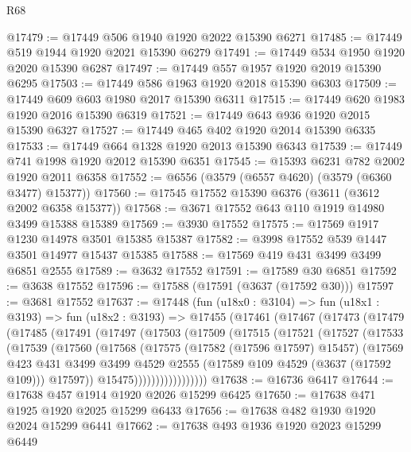 \begin{lexlean}{R68}
\begin{coremodule}
@17479 := @17449 @506 @1940 @1920 @2022 @15390 @6271
@17485 := @17449 @519 @1944 @1920 @2021 @15390 @6279
@17491 := @17449 @534 @1950 @1920 @2020 @15390 @6287
@17497 := @17449 @557 @1957 @1920 @2019 @15390 @6295
@17503 := @17449 @586 @1963 @1920 @2018 @15390 @6303
@17509 := @17449 @609 @603 @1980 @2017 @15390 @6311
@17515 := @17449 @620 @1983 @1920 @2016 @15390 @6319
@17521 := @17449 @643 @936 @1920 @2015 @15390 @6327
@17527 := @17449 @465 @402 @1920 @2014 @15390 @6335
@17533 := @17449 @664 @1328 @1920 @2013 @15390 @6343
@17539 := @17449 @741 @1998 @1920 @2012 @15390 @6351
@17545 := @15393 @6231 @782 @2002 @1920 @2011 @6358
@17552 := @6556 (@3579 (@6557 @4620) (@3579 (@6360 @3477) @15377))
@17560 := @17545 @17552 @15390 @6376 (@3611 (@3612 @2002 @6358 @15377))
@17568 := @3671 @17552 @643 @110 @1919 @14980 @3499 @15388 @15389
@17569 := @3930 @17552
@17575 := @17569 @1917 @1230 @14978 @3501 @15385 @15387
@17582 := @3998 @17552 @539 @1447 @3501 @14977 @15437 @15385
@17588 := @17569 @419 @431 @3499 @3499 @6851 @2555
@17589 := @3632 @17552
@17591 := @17589 @30 @6851
@17592 := @3638 @17552
@17596 := @17588 (@17591 (@3637 (@17592 @30)))
@17597 := @3681 @17552
@17637 := @17448
    (fun (u18x0 : @3104) =>
    fun (u18x1 : @3193) =>
    fun (u18x2 : @3193) =>
    @17455
      (@17461
        (@17467
          (@17473
            (@17479
              (@17485
                (@17491
                  (@17497
                    (@17503
                      (@17509
                        (@17515
                          (@17521
                            (@17527
                              (@17533
                                (@17539
                                  (@17560
                                    (@17568
                                      (@17575
                                        (@17582 (@17596 @17597) @15457)
                                        (@17569
                                          @423
                                          @431
                                          @3499
                                          @3499
                                          @4529
                                          @2555
                                          (@17589 @109 @4529 (@3637 (@17592 @109)))
                                          @17597))
                                      @15475)))))))))))))))))
@17638 := @16736 @6417
@17644 := @17638 @457 @1914 @1920 @2026 @15299 @6425
@17650 := @17638 @471 @1925 @1920 @2025 @15299 @6433
@17656 := @17638 @482 @1930 @1920 @2024 @15299 @6441
@17662 := @17638 @493 @1936 @1920 @2023 @15299 @6449

\end{coremodule}
\end{lexlean}
